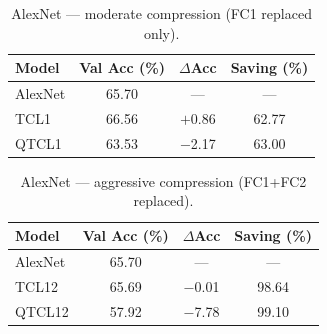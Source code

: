 \begin{table}[t]
\centering
\small
\caption{AlexNet --- moderate compression (FC1 replaced only).}
\label{tab:alex_moderate}
\setlength{\tabcolsep}{5pt}
\renewcommand{\arraystretch}{1.15}
\begin{tabular}{lccc}
\toprule
\textbf{Model} & \textbf{Val Acc (\%)} & \textbf{$\Delta$Acc} & \textbf{Saving (\%)} \\
\midrule
AlexNet              & 65.70 & ---              & ---   \\
TCL1                  & 66.56 & $+$0.86          & 62.77 \\
QTCL1      & 63.53 & $-$2.17          & 63.00 \\
\bottomrule
\end{tabular}
\end{table}

\begin{table}[t]
\centering
\small
\caption{AlexNet --- aggressive compression (FC1+FC2 replaced).}
\label{tab:alex_aggressive}
\setlength{\tabcolsep}{5pt}
\renewcommand{\arraystretch}{1.15}
\begin{tabular}{lccc}
\toprule
\textbf{Model} & \textbf{Val Acc (\%)} & \textbf{$\Delta$Acc} & \textbf{Saving (\%)} \\
\midrule
AlexNet              & 65.70 & ---              & ---    \\
TCL12                & 65.69 & $-$0.01          & 98.64  \\
QTCL12      & 57.92 & $-$7.78          & 99.10  \\
\bottomrule
\end{tabular}
\end{table}
